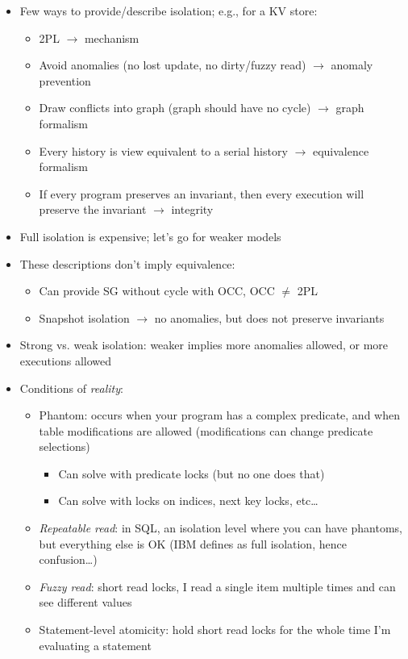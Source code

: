 \documentclass[10pt]{article}
\begin{document}
\begin{itemize}
\item Few ways to provide/describe isolation; e.g., for a KV store:
\begin{itemize}
\item 2PL $\rightarrow$ mechanism
\item Avoid anomalies (no lost update, no dirty/fuzzy read) $\rightarrow$ anomaly prevention
\item Draw conflicts into graph (graph should have no cycle) $\rightarrow$ graph formalism
\item Every history is view equivalent to a serial history $\rightarrow$ equivalence formalism
\item If every program preserves an invariant, then every execution will preserve the invariant $\rightarrow$
integrity
\end{itemize}
\item Full isolation is expensive; let's go for weaker models
\item These descriptions don't imply equivalence:
\begin{itemize}
\item Can provide SG without cycle with OCC, OCC $\ne$ 2PL
\item Snapshot isolation $\rightarrow$ no anomalies, but does not preserve invariants
\end{itemize}
\item Strong vs. weak isolation: weaker implies more anomalies allowed, or more executions allowed
\item Conditions of \emph{reality}:
\begin{itemize}
\item Phantom: occurs when your program has a complex predicate, and when table modifications are
allowed (modifications can change predicate selections)
\begin{itemize}
\item Can solve with predicate locks (but no one does that)
\item Can solve with locks on indices, next key locks, etc\dots
\end{itemize}
\item \emph{Repeatable read}: in SQL, an isolation level where you can have phantoms, but everything
else is OK (IBM defines as full isolation, hence confusion\dots)
\item \emph{Fuzzy read}: short read locks, I read a single item multiple times and can see different
values
\item Statement-level atomicity: hold short read locks for the whole time I'm evaluating a statement

\end{itemize}
\end{itemize}
\end{document}
